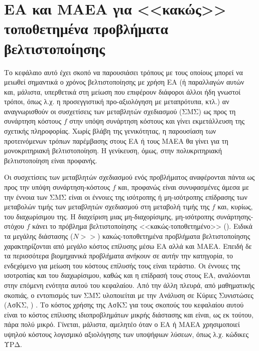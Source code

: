 \ifpdf
    \graphicspath{{4/figures/PNG/}{4/figures/PDF/}{3/figures/}}
\else
    \graphicspath{{4/figures/EPS/}{4/figures/}}
\fi

\chapter{ΕΑ και ΜΑΕΑ για <<κακώς>> τοποθετημένα προβλήματα βελτιστοποίησης} %
\label{VarCorrChapter}
Το κεφάλαιο αυτό έχει σκοπό να παρουσιάσει τρόπους με τους οποίους μπορεί να μειωθεί σημαντικά ο χρόνος βελτιστοποίησης με χρήση ΕΑ (ή  παραλλαγών αυτών και, μάλιστα, υπερθετικά στη μείωση που επιφέρουν διάφοροι άλλοι ήδη γνωστοί τρόποι, όπως λ.χ. η προσεγγιστική προ-αξιολόγηση με μεταπρότυπα, κτλ.) αν αναγνωρισθούν οι συσχετίσεις των μεταβλητών σχεδιασμού (ΣΜΣ) ως προς τη συνάρτηση κόστους $f$ \cite{Salomon,Roy_2002a,Ghisu_2010} στην υπόψη συνάρτηση κόστους και γίνει εκμετάλλευση της σχετικής πληροφορίας. Χωρίς βλάβη της γενικότητας, η παρουσίαση των προτεινόμενων τρόπων παρέμβασης στους ΕΑ ή τους ΜΑΕΑ θα γίνει για τη μονοκριτηριακή βελτιστοποίηση. Η γενίκευση, όμως, στην πολυκριτηριακή βελτιστοποίηση είναι προφανής. 

Οι συσχετίσεις των μεταβλητών σχεδιασμού ενός προβλήματος αναφέρονται πάντα ως προς την υπόψη συνάρτηση-κόστους $f$ και, προφανώς είναι συνυφασμένες άμεσα με την έννοια των ΣΜΣ είναι οι έννοιες της ισότροπης ή μη-ισότροπης επίδρασης των μεταβολών τιμής των μεταβλητών σχεδιασμού στη μεταβολή τιμής της $f$ και, κυρίως, του διαχωρίσιμου της. Η διαχείριση μιας μη-διαχορίσιμης, μη-ισότροπης συνάρτησης-στόχου $f$ κάνει το πρόβλημα βελτιστοποίησης <<κακώς-τοποθετημένο>> (). Ειδικά τα μεγάλης διάστασης ($N>>$) κακώς-τοποθετημένα προβλήματα βελτιστοποίησης χαρακτηρίζονται από μεγάλο κόστος επίλυσης μέσω ΕΑ αλλά και ΜΑΕΑ. Επειδή δε τα περισσότερα βιομηχανικά προβλήματα ανήκουν σε αυτήν την κατηγορία, το ενδεχόμενο για μείωση του κόστους επίλυσής τους είναι τεράστιο.  Οι έννοιες της ισοτροπίας και του διαχωρίσιμου, καθώς και η επίδρασή τους στους ΕΑ, αναλύονται στην επόμενη ενότητα αυτού του κεφαλαίου. Από την άλλη πλευρά, από μαθηματικής σκοπιάς, ο εντοπισμός των ΣΜΣ υλοποιείται με την Ανάλυση σε Κύριες Συνιστώσες (ΑσΚΣ, ) \cite{Haykin}. Το κόστος χρήσης της ΑσΚΣ για τους σκοπούς του κεφαλαίου αυτού είναι το κόστος επίλυσης ιδιοπροβλημάτων μικρής διάστασης και είναι, ως εκ τούτου, πάρα πολύ μικρό. Γίνεται, μάλιστα, αμελητέο όταν ο ΕΑ ή ΜΑΕΑ χρησιμοποιεί υψηλού κόστους λογισμικό αξιολόγησης των υποψήφιων λύσεων, όπως λ.χ. κώδικες ΥΡΔ.

